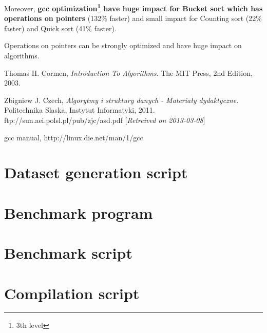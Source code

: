 \documentclass[12pt]{article}
\begin{document}
Moreover, \textbf{gcc optimization\footnote{3th level} have huge impact for Bucket sort which has operations on pointers} (132\% faster) and small impact for Counting sort (22\% faster) and Quick sort (41\% faster).

Operations on pointers can be strongly optimized and have huge impact on algorithms.

\newpage
\begin{thebibliography}{9}

  Thomas H. Cormen,
  \emph{Introduction To Algorithms}.
  The MIT Press,
  2nd Edition,
  2003.

  Zbigniew J. Czech,
  \emph{Algorytmy i struktury danych - Materiały dydaktyczne}.
  Politechnika Slaska, Instytut Informatyki,
  2011.
  ftp://sun.aei.polsl.pl/pub/zjc/asd.pdf [\emph{Retreived on 2013-03-08}]

  gcc manual,
  http://linux.die.net/man/1/gcc

\end{thebibliography}

\begin{appendices}
	\section{Dataset generation script}
	\label{app:dataset}

	
	
	\section{Benchmark program}
	\label{app:benchmark}

	
	
	\section{Benchmark script}
	\label{app:benchmark-script}

	
	
	\section{Compilation script}
	\label{app:compilation}

	

\end{appendices}
\end{document}
